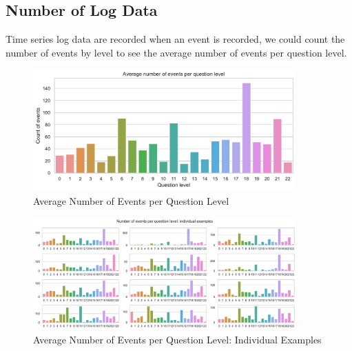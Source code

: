 \documentclass[11pt,a4paper]{article}
\begin{document}
    \subsection{Number of Log Data}
    \label{sec:no_log}
    Time series log data are recorded when an event is recorded, we could count the number of events by level to see the average number of events per question level.
    \begin{figure}[H]
        \centering
        \includegraphics[width = 0.9\textwidth]{EDA_plot/event_per_question.pdf}
        \caption{Average Number of Events per Question Level}
        \label{fig:event_per_question}
    \end{figure}
    \begin{figure}[H]
        \centering
        \includegraphics[width = 0.9\textwidth]{EDA_plot/event_per_question_individual.pdf}
        \caption{Average Number of Events per Question Level: Individual Examples}
        \label{fig:event_per_question_individual}
    \end{figure}
\end{document}
